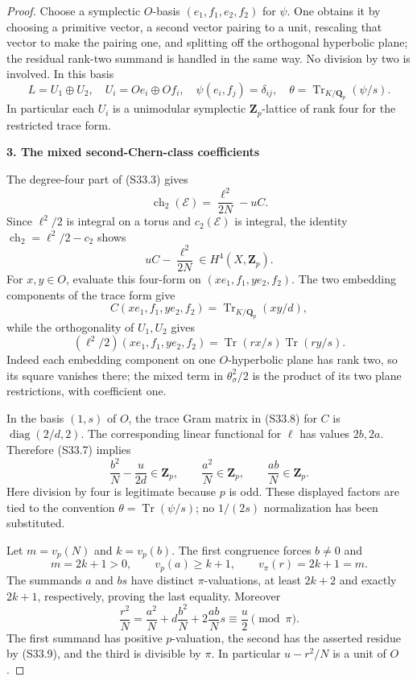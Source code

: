 \begin{proof}
Choose a symplectic \(O\)-basis \((e_1,f_1,e_2,f_2)\) for \(\psi\). One obtains it by choosing a primitive vector, a second vector pairing to a unit, rescaling that vector to make the pairing one, and splitting off the orthogonal hyperbolic plane; the residual rank-two summand is handled in the same way. No division by two is involved. In this basis \[
 L=U_1\oplus U_2,
 \quad U_i=Oe_i\oplus Of_i,
 \quad \psi(e_i,f_j)=\delta_{ij},
 \quad \theta=\operatorname{Tr}_{K/\mathbf Q_p}(\psi/s).
 \tag{S33.6}
\] In particular each \(U_i\) is a unimodular symplectic \(\mathbf Z_p\)-lattice of rank four for the restricted trace form.

\par\medskip\noindent\textbf{3. The mixed second-Chern-class coefficients}\quad 

The degree-four part of (S33.3) gives \[
 \operatorname{ch}_2(\mathcal E)=\frac{\ell^2}{2N}-uC.
\] Since \(\ell^2/2\) is integral on a torus and \(c_2(\mathcal E)\) is integral, the identity \(\operatorname{ch}_2=\ell^2/2-c_2\) shows \[
 uC-\frac{\ell^2}{2N}\in H^4(X,\mathbf Z_p).
 \tag{S33.7}
\] For \(x,y\in O\), evaluate this four-form on \((xe_1,f_1,ye_2,f_2)\). The two embedding components of the trace form give \[
 C(xe_1,f_1,ye_2,f_2)=\operatorname{Tr}_{K/\mathbf Q_p}(xy/d),
\] while the orthogonality of \(U_1,U_2\) gives \[
 (\ell^2/2)(xe_1,f_1,ye_2,f_2)
 =\operatorname{Tr}(rx/s)\operatorname{Tr}(ry/s).
 \tag{S33.8}
\] Indeed each embedding component on one \(O\)-hyperbolic plane has rank two, so its square vanishes there; the mixed term in \(\theta_\sigma^2/2\) is the product of its two plane restrictions, with coefficient one.

In the basis \((1,s)\) of \(O\), the trace Gram matrix in (S33.8) for \(C\) is \(\operatorname{diag}(2/d,2)\). The corresponding linear functional for \(\ell\) has values \(2b,2a\). Therefore (S33.7) implies \[
 \frac{b^2}{N}-\frac{u}{2d}\in\mathbf Z_p,
 \qquad \frac{a^2}{N}\in\mathbf Z_p,
 \qquad \frac{ab}{N}\in\mathbf Z_p.
 \tag{S33.9}
\] Here division by four is legitimate because \(p\) is odd. These displayed factors are tied to the convention \(\theta=\operatorname{Tr}(\psi/s)\); no \(1/(2s)\) normalization has been substituted.

Let \(m=v_p(N)\) and \(k=v_p(b)\). The first congruence forces \(b\ne0\) and \[
 m=2k+1>0,
 \qquad v_p(a)\ge k+1,
 \qquad v_\pi(r)=2k+1=m.
 \tag{S33.10}
\] The summands \(a\) and \(bs\) have distinct \(\pi\)-valuations, at least \(2k+2\) and exactly \(2k+1\), respectively, proving the last equality. Moreover \[
 \frac{r^2}{N}
 =\frac{a^2}{N}+d\frac{b^2}{N}
             +2\frac{ab}{N}s
 \equiv\frac u2\pmod\pi.
 \tag{S33.11}
\] The first summand has positive \(p\)-valuation, the second has the asserted residue by (S33.9), and the third is divisible by \(\pi\). In particular \(u-r^2/N\) is a unit of \(O\).


\end{proof}
